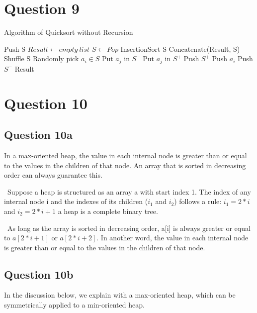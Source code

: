 \documentclass[11pt]{article}
\begin{document}
\newpage
\section{Question 9}
\label{q9}
\begin{algorithm}
\caption{Algorithm of Quicksort without Recursion}
\begin{algorithmic}[1]
\State Push {S}
\State $Result \gets empty\ list $
    \State $S \gets Pop$
        \State InsertionSort S
        \State Concatenate(Result, S)
    \Else
        \State Shuffle S
        \State Randomly pick $a_i \in S$
                \State Put $a_j$ in $S^-$
            \Else
                \State Put $a_j$ in $S^+$
            \EndIf
        \EndFor
        \State Push $S^+$
        \State Push $a_i$
        \State Push $S^-$
    \EndIf
\EndWhile
\State \Return Result
\EndProcedure
\end{algorithmic}
\end{algorithm}
\newpage
\section{Question 10}
\label{q10}
\subsection{Question 10a}
In a max-oriented heap, the value in each internal node is greater than or equal to the values in the children of that node. An array that is sorted in decreasing order can always guarantee this. 

~\newline\noindent Suppose a heap is structured as an array a with start index 1. The index of any internal node i and the indexes of its children ($i_1$ and $i_2$) follows a rule: $i_1 = 2 * i$ and $i_2 = 2 * i + 1$ a heap is a complete binary tree.

~\newline\noindent As long as the array is sorted in decreasing order, a[i] is always greater or equal to $a[2 * i + 1]$ or $a[2 * i + 2]$. In another word, the value in each internal node is greater than or equal to the values in the children of that node.

\subsection{Question 10b}
In the discussion below, we explain with a max-oriented heap, which can be symmetrically applied to a min-oriented heap. 
\end{document}
